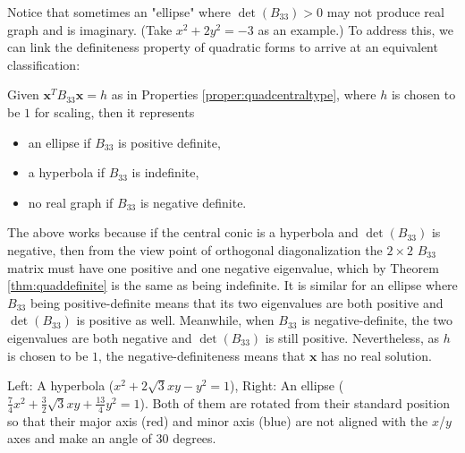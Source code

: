 Notice that sometimes an "ellipse" where $\det(B_{33}) > 0$ may not produce real graph and is imaginary. (Take $x^2 + 2y^2 = -3$ as an example.) To address this, we can link the definiteness property of quadratic forms to arrive at an equivalent classification:
\begin{thm}
\label{thm:quadcentraltypealt}
Given $\textbf{x}^TB_{33}\textbf{x} = h$ as in Properties \ref{proper:quadcentraltype}, where $h$ is chosen to be $1$ for scaling, then it represents
\begin{itemize}
\item an ellipse if $B_{33}$ is positive definite,
\item a hyperbola if $B_{33}$ is indefinite,
\item no real graph if $B_{33}$ is negative definite.
\end{itemize}
\end{thm}
The above works because if the central conic is a hyperbola and $\det(B_{33})$ is negative, then from the view point of orthogonal diagonalization the $2 \times 2$ $B_{33}$ matrix must have one positive and one negative eigenvalue, which by Theorem \ref{thm:quaddefinite} is the same as being indefinite. It is similar for an ellipse where $B_{33}$ being positive-definite means that its two eigenvalues are both positive and $\det(B_{33})$ is positive as well. Meanwhile, when $B_{33}$ is negative-definite, the two eigenvalues are both negative and $\det(B_{33})$ is still positive. Nevertheless, as $h$ is chosen to be $1$, the negative-definiteness means that $\textbf{x}$ has no real solution.
\begin{center}
\end{center}
Left: A hyperbola ($x^2 + 2\sqrt{3}xy - y^2 = 1$), Right: An ellipse ($\frac{7}{4}x^2 + \frac{3}{2}\sqrt{3}xy + \frac{13}{4}y^2 = 1$). Both of them are rotated from their standard position so that their major axis (red) and minor axis (blue) are not aligned with the $x$/$y$ axes and make an angle of 30 degrees.\par


